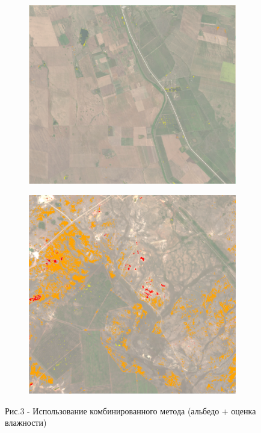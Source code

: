 \begin{figure}[H]
   \centering
   \begin{subfigure}{0.45\textwidth}
   	\centering
   	\includegraphics[width=\textwidth,height=0.8\textwidth]{media/ict/image35}
   \end{subfigure}
   \begin{subfigure}{0.45\textwidth}
   	\centering
   	\includegraphics[width=\textwidth,height=0.8\textwidth]{media/ict/image36}
   \end{subfigure}
   \caption*{Рис.3 - Использование комбинированного метода (альбедо + оценка влажности)}
\end{figure}

